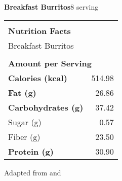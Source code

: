 \documentclass[../recipe-collections/cooking.tex]{subfiles}
\begin{document}
\begin{recipe}{\textbf{Breakfast Burritos}}{8 serving}{}
  \bigskip
  \centering
  \begin{tabular}{|lr|}
    \hline
                                        &                                       \\
    \multicolumn{2}{|l|}{\huge{\textbf{\textrm{Nutrition Facts}}}}              \\
    \multicolumn{2}{|l|}{\textrm{Breakfast Burritos}}                               \\ 
                                        &                                       \\
    \multicolumn{2}{|l|}{\footnotesize{\textbf{\textrm{Amount per Serving}}}}   \\ \hline
    \textbf{\textrm{Calories (kcal)}}   & \textrm{514.98}                          \\ \hline
    \textbf{\textrm{Fat (g)}}           & \textrm{26.86}                           \\ \hline
    \textbf{\textrm{Carbohydrates (g)}} & \textrm{37.42}                            \\ \hline
    \hspace{2mm} \textrm{Sugar (g)}     & \textrm{0.57}                            \\ \hline
    \hspace{2mm} \textrm{Fiber (g)}     & \textrm{23.50}                            \\ \hline
    \textbf{\textrm{Protein (g)}} & \textrm{30.90}                            \\ \hline
  \end{tabular}

  \freeform{}\hrulefill{}

\end{recipe}

Adapted from  
\autocite{Pillsbury_BreakfastBurritos_2021} and
\autocite{MirlandrasKitchen_HashBrowns_2017}
\end{document}
